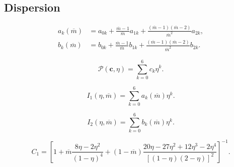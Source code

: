 \documentclass[11pt]{article}
\begin{document}
\subsection{Dispersion}

\begin{equation}
\begin{aligned}
a_k(\overline m)&=a_{0k}
+\frac{\overline m-1}{\overline m}a_{1k}
+\frac{(\overline m-1)(\overline m-2)}{\overline m^2}a_{2k},\\
b_k(\overline m)&=b_{0k}
+\frac{\overline m-1}{\overline m}b_{1k}
+\frac{(\overline m-1)(\overline m-2)}{\overline m^2}b_{2k}.
\end{aligned}
\label{eq:dispersion_chain_coefficients}
\end{equation}

\begin{equation}
\mathcal{P}(\boldsymbol{c},\eta)=\sum_{k=0}^{6}c_k\eta^k.
\label{eq:dispersion_polynomial}
\end{equation}

\begin{equation}
I_1(\eta,\overline m)=\sum_{k=0}^{6}a_k(\overline m)\eta^k.
\label{eq:dispersion_integral_one}
\end{equation}

\begin{equation}
I_2(\eta,\overline m)=\sum_{k=0}^{6}b_k(\overline m)\eta^k.
\label{eq:dispersion_integral_two}
\end{equation}

\begin{equation}
C_1=\left[
1+\overline m\frac{8\eta-2\eta^2}{(1-\eta)^4}
+(1-\overline m)
\frac{20\eta-27\eta^2+12\eta^3-2\eta^4}
{[(1-\eta)(2-\eta)]^2}
\right]^{-1}.
\label{eq:dispersion_compressibility_factor}
\end{equation}
\end{document}
